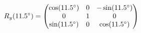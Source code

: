 \documentclass[preview]{standalone}
\begin{document}
\begin{align*}
\special{dvisvgm:raw <g id='unique000'>}R_y(11.5^\circ) = \begin{pmatrix} \cos(11.5^\circ) & 0 & -\sin(11.5^\circ) \\ 0 & 1 & 0 \\ \sin(11.5^\circ) & 0 & \cos(11.5^\circ) \end{pmatrix}\special{dvisvgm:raw </g>}
\end{align*}
\end{document}
